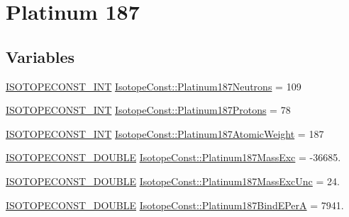 \hypertarget{group___isotope_const-_platinum-_pt187}{}\section{Platinum 187}
\label{group___isotope_const-_platinum-_pt187}
\subsection*{Variables}
\begin{DoxyCompactItemize}
\item 
\mbox{\hyperlink{group___isotope_const-_macros_ga5f18360b3e99483a35c32d789e62621c}{I\+S\+O\+T\+O\+P\+E\+C\+O\+N\+S\+T\+\_\+\+I\+NT}} \mbox{\hyperlink{group___isotope_const-_platinum-_pt187_gac27572b3e8251896b954c4789bc686cf}{Isotope\+Const\+::\+Platinum187\+Neutrons}} = 109
\item 
\mbox{\hyperlink{group___isotope_const-_macros_ga5f18360b3e99483a35c32d789e62621c}{I\+S\+O\+T\+O\+P\+E\+C\+O\+N\+S\+T\+\_\+\+I\+NT}} \mbox{\hyperlink{group___isotope_const-_platinum-_pt187_ga2d1e504c10d4b204ec63bf94f319d13c}{Isotope\+Const\+::\+Platinum187\+Protons}} = 78
\item 
\mbox{\hyperlink{group___isotope_const-_macros_ga5f18360b3e99483a35c32d789e62621c}{I\+S\+O\+T\+O\+P\+E\+C\+O\+N\+S\+T\+\_\+\+I\+NT}} \mbox{\hyperlink{group___isotope_const-_platinum-_pt187_ga34312f01eed3504431cc5e96f2cb1be3}{Isotope\+Const\+::\+Platinum187\+Atomic\+Weight}} = 187
\item 
\mbox{\hyperlink{group___isotope_const-_macros_ga8f45a7272ce02c0b4c65c44636ed719a}{I\+S\+O\+T\+O\+P\+E\+C\+O\+N\+S\+T\+\_\+\+D\+O\+U\+B\+LE}} \mbox{\hyperlink{group___isotope_const-_platinum-_pt187_ga59b43b92bfb25d0a8be5082fd4e78293}{Isotope\+Const\+::\+Platinum187\+Mass\+Exc}} = -\/36685.
\item 
\mbox{\hyperlink{group___isotope_const-_macros_ga8f45a7272ce02c0b4c65c44636ed719a}{I\+S\+O\+T\+O\+P\+E\+C\+O\+N\+S\+T\+\_\+\+D\+O\+U\+B\+LE}} \mbox{\hyperlink{group___isotope_const-_platinum-_pt187_ga87cf5393b7182699f6b3337ee816419f}{Isotope\+Const\+::\+Platinum187\+Mass\+Exc\+Unc}} = 24.
\item 
\mbox{\hyperlink{group___isotope_const-_macros_ga8f45a7272ce02c0b4c65c44636ed719a}{I\+S\+O\+T\+O\+P\+E\+C\+O\+N\+S\+T\+\_\+\+D\+O\+U\+B\+LE}} \mbox{\hyperlink{group___isotope_const-_platinum-_pt187_ga3aa179ff446ff8d23635b3a77baba72c}{Isotope\+Const\+::\+Platinum187\+Bind\+E\+PerA}} = 7941.
\item 

\end{DoxyCompactItemize}
